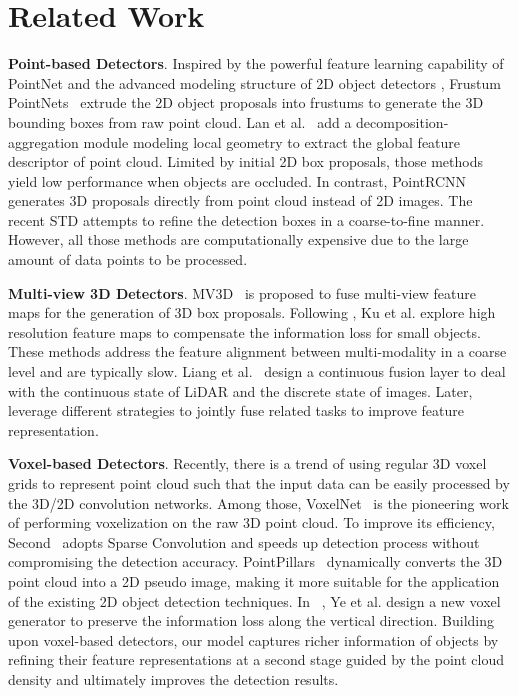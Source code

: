 \documentclass[runningheads]{llncs}
\begin{document}
\section{Related Work}

\noindent\textbf{Point-based Detectors}.
Inspired by the powerful feature learning capability of PointNet \cite{qi2017pointnet,qi2017pointnet++} and the advanced modeling structure of 2D object detectors \cite{Girshick_2014_CVPR,Girshick_2015_ICCV,ren2015faster}, Frustum PointNets~\cite{qi2018frustum} extrude the 2D object proposals into frustums to generate the 3D bounding boxes from raw point cloud. Lan et al.~\cite{Lan_2019_CVPR} add a decomposition-aggregation module modeling local geometry to extract the global feature descriptor of point cloud. Limited by initial 2D box proposals, those methods yield low performance when objects are occluded. In contrast, PointRCNN \cite{shi2019pointrcnn} generates 3D proposals directly from point cloud instead of 2D images. The recent STD \cite{yang2019std} attempts to refine the detection boxes in a coarse-to-fine manner. However, all those methods are computationally expensive due to the large amount of data points to be processed. 

\noindent\textbf{Multi-view 3D Detectors}.
MV3D~\cite{chen2017multi} is proposed to fuse multi-view feature maps for the generation of 3D box proposals. Following \cite{chen2017multi}, Ku et al. \cite{ku2018joint} explore high resolution feature maps to compensate the information loss for small objects. These methods address the feature alignment between multi-modality in a coarse level and are typically slow. Liang et al.~\cite{Liang_2018_ECCV} design a continuous fusion layer to deal with the continuous state of LiDAR and the discrete state of images. Later, ~\cite{liang2019multi,vora2019pointpainting} leverage different strategies to jointly fuse related tasks to improve feature representation.

\noindent\textbf{Voxel-based Detectors}.
Recently, there is a trend of using regular 3D voxel grids to represent point cloud such that the input data can be easily processed by the 3D/2D convolution networks. Among those, VoxelNet~\cite{zhou2018voxelnet} is the pioneering work of performing voxelization on the raw 3D point cloud. To improve its efficiency, Second~\cite{yan2018second} adopts Sparse Convolution and speeds up detection process without compromising the detection accuracy. PointPillars~\cite{lang2019PointPillars} dynamically converts the 3D point cloud into a 2D pseudo image, making it more suitable for the application of the existing 2D object detection techniques. In ~\cite{ye2020sarpnet}, Ye et al. design a new voxel generator to preserve the information loss along the vertical direction. Building upon voxel-based detectors, our model captures richer information of objects by refining their feature representations at a second stage guided by the point cloud density and ultimately improves the detection results. 
\end{document}
